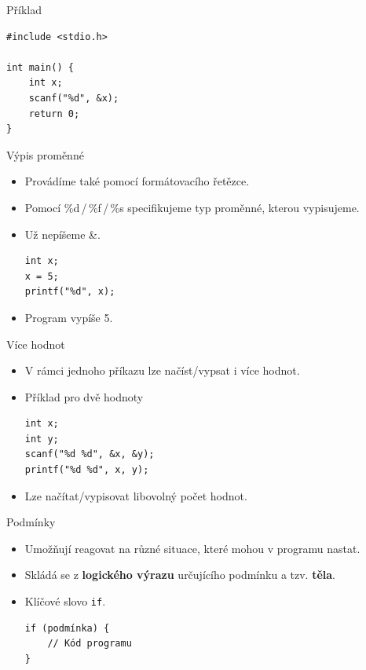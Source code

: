 \documentclass[14pt]{beamer}
\begin{document}
    \begin{frame}[t,fragile]{Příklad}
        \begin{lstlisting}
#include <stdio.h>

int main() {
    int x;
    scanf("%d", &x);
    return 0;
}
        \end{lstlisting}
    \end{frame}

    \begin{frame}[t,fragile]{Výpis proměnné}
        \begin{itemize}
            \item Provádíme také pomocí formátovacího řetězce.
            \item Pomocí \%d\,/\,\%f\,/\,\%s specifikujeme typ proměnné, kterou vypisujeme.
            \item Už nepíšeme \&.
            \begin{lstlisting}
int x;
x = 5;
printf("%d", x);
            \end{lstlisting}
            \item Program vypíše 5.
        \end{itemize}
    \end{frame}

    \begin{frame}[t,fragile]{Více hodnot}
        \begin{itemize}
            \item V rámci jednoho příkazu lze načíst/vypsat i více hodnot.
            \item Příklad pro dvě hodnoty
            \begin{lstlisting}
int x;
int y;
scanf("%d %d", &x, &y);
printf("%d %d", x, y);
            \end{lstlisting}
            \item Lze načítat/vypisovat libovolný počet hodnot.
        \end{itemize}
    \end{frame}

    \begin{frame}[t,fragile]{Podmínky}
        \begin{itemize}
            \item Umožňují reagovat na různé situace, které mohou v programu nastat.
            \item Skládá se z \textbf{logického výrazu} určujícího podmínku a tzv. \textbf{těla}.
            \item Klíčové slovo \texttt{if}.
            \begin{lstlisting}
if (podmínka) {
    // Kód programu
}
            \end{lstlisting}
        \end{itemize}
    \end{frame}
\end{document}
